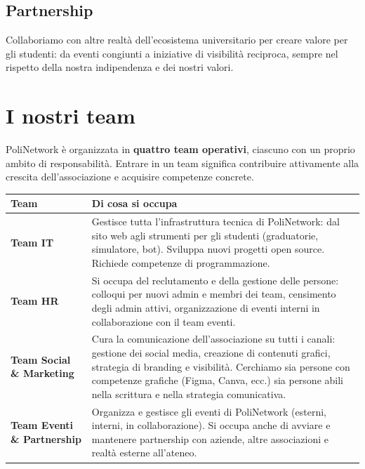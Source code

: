 \documentclass[11pt,a4paper]{article}
\begin{document}
\subsection{Partnership}

Collaboriamo con altre realtà dell'ecosistema universitario per
creare valore per gli studenti: da eventi congiunti a iniziative
di visibilità reciproca, sempre nel rispetto della nostra
indipendenza e dei nostri valori.

\section{I nostri team}

PoliNetwork è organizzata in \textbf{quattro team operativi},
ciascuno con un proprio ambito di responsabilità. Entrare in un
team significa contribuire attivamente alla crescita
dell'associazione e acquisire competenze concrete.

\begin{center}
\renewcommand{\arraystretch}{1.6}
\begin{tabularx}{\textwidth}{>{\bfseries\color{pnblue}}l X}
\toprule
\textbf{Team} & \textbf{Di cosa si occupa} \\
\midrule
Team IT &
Gestisce tutta l'infrastruttura tecnica di PoliNetwork: dal
sito web agli strumenti per gli studenti (graduatorie, simulatore,
bot). Sviluppa nuovi progetti open source. Richiede competenze
di programmazione. \\
\addlinespace
Team HR &
Si occupa del reclutamento e della gestione delle persone:
colloqui per nuovi admin e membri dei team, censimento degli
admin attivi, organizzazione di eventi interni in collaborazione
con il team eventi. \\
\addlinespace
Team Social \& Marketing &
Cura la comunicazione dell'associazione su tutti i canali: gestione
dei social media, creazione di contenuti grafici, strategia di
branding e visibilità. Cerchiamo sia persone con competenze
grafiche (Figma, Canva, ecc.) sia persone abili nella scrittura
e nella strategia comunicativa. \\
\addlinespace
Team Eventi \& Partnership &
Organizza e gestisce gli eventi di PoliNetwork (esterni, interni,
in collaborazione). Si occupa anche di avviare e mantenere
partnership con aziende, altre associazioni e realtà esterne
all'ateneo. \\
\bottomrule
\end{tabularx}
\end{center}
\end{document}
